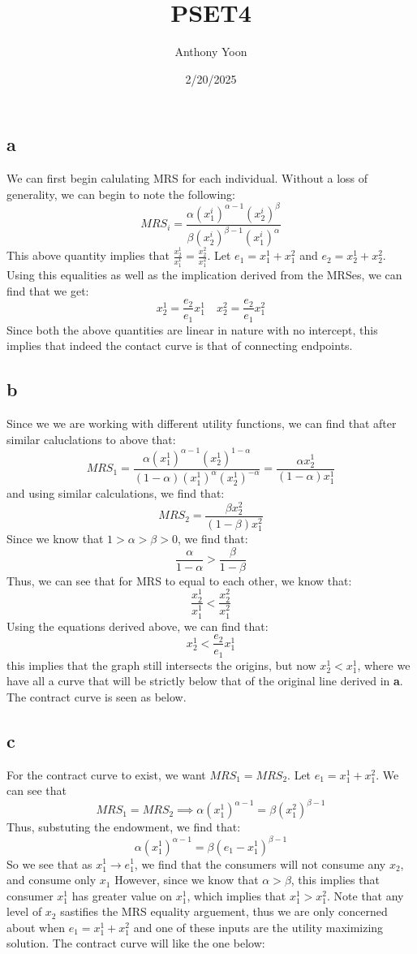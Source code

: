 \documentclass[11pt]{article}
\title{PSET4}
\author{Anthony Yoon}
\date{2/20/2025}
\begin{document}
\maketitle
\section{}
\subsection*{a}
We can first begin calulating MRS for each individual. Without a loss of generality, we can begin to note the following:
\[
MRS_i = \frac{\alpha (x_1^i)^{\alpha -1}(x_2^i)^\beta}{\beta(x_2^i)^{\beta - 1}(x_1^i)^\alpha}
\]
This above quantity implies that $\frac{x_2^1}{x_1^1} = \frac{x_2^2}{x_1^2}$. Let $e_1 = x_1^1 + x_1^2$ and $e_2 = x_2^1 + x_2^2$. Using this equalities as well as the implication derived from the MRSes, we can find that we get:
\[
x_2^1 = \frac{e_2}{e_1} x_1^1 \quad x_2^2 = \frac{e_2}{e_1} x_1^2
\]
Since both the above quantities are linear in nature with no intercept, this implies that indeed the contact curve is that of connecting endpoints. 
\subsection*{b}
Since we we are working with different utility functions, we can find that after similar caluclations to above that:
\[
MRS_1 = \frac{\alpha (x_1^1)^{\alpha - 1}(x_2^1)^{1-\alpha}}{(1-\alpha)(x_1^1)^\alpha (x_2^1)^{-\alpha}} = \frac{\alpha x_2^1}{(1-\alpha)x_1^1}
\]
and using similar calculations, we find that:
\[
MRS_2 = \frac{\beta x^2_2}{(1-\beta)x_1^2}
\]
Since we know that $1 > \alpha > \beta > 0$, we find that:
\[
\frac{\alpha}{1-\alpha} > \frac{\beta}{1-\beta}
\]
Thus, we can see that for MRS to equal to each other, we know that:
\[
\frac{x_2^1}{x_1^1} < \frac{x^2_2}{x^2_1}
\]
Using the equations derived above, we can find that:
\[
x_2^1 < \frac{e_2}{e_1} x_1^1
\]
this implies that the graph still intersects the origins, but now $x_2^1 < x_1^1$, where we have all a curve that will be strictly below that of the original line derived in \textbf{a}. The contract curve is seen as below. 
\subsection*{c}
For the contract curve to exist, we want $MRS_1 = MRS_2$. Let $e_1 = x_1^1 + x_1^2$. We can see that
\[
MRS_1 = MRS_2 \implies \alpha (x_1^1)^{\alpha - 1} = \beta (x_1^2)^{\beta - 1}
\]
Thus, substuting the endowment, we find that:
\[
    \alpha(x_1^1)^{\alpha - 1} = \beta (e_1 - x_1^1)^{\beta - 1}
\]
So we see that as $ x_1^1 \to e^1_1$, we find that the consumers will not consume any $x_2$, and consume only $x_1$ However, since we know that $\alpha > \beta$, this implies that consumer $x_1^1$ has greater value on $x_1^1$, which implies that $x_1^1  > x_1^2$. Note that any level of $x_2$ sastifies the MRS equality arguement, thus we are only concerned about when $e_1 = x_1^1 + x_1^2$ and one of these inputs are the utility maximizing solution. The contract curve will like the one below:
\newpage
\end{document}

